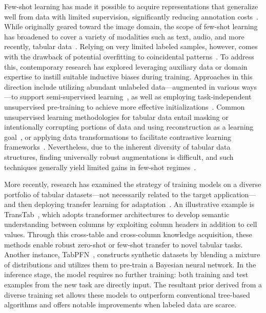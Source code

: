 Few-shot learning has made it possible to acquire representations that generalize well from data with limited supervision, significantly reducing annotation costs~\cite{chen2018closer}. While originally geared toward the image domain, the scope of few-shot learning has broadened to cover a variety of modalities such as text, audio, and more recently, tabular data~\cite{majumder2022few,nam2023stunt,schick2021exploiting}. Relying on very limited labeled samples, however, comes with the drawback of potential overfitting to coincidental patterns~\cite{bartlett2021deep}. To address this, contemporary research has explored leveraging auxiliary data or domain expertise to instill suitable inductive biases during training. Approaches in this direction include utilizing abundant unlabeled data—augmented in various ways—to support semi-supervised learning~\cite{ucar2021subtab,yoon2020vime}, as well as employing task-independent unsupervised pre-training to achieve more effective initializations~\cite{somepalli2021saint}. Common unsupervised learning methodologies for tabular data entail masking or intentionally corrupting portions of data and using reconstruction as a learning goal~\cite{arik2021tabnet,majmundar2022met}, or applying data transformations to facilitate contrastive learning frameworks~\cite{bahri2022scarf,chen2020simple}. Nevertheless, due to the inherent diversity of tabular data structures, finding universally robust augmentations is difficult, and such techniques generally yield limited gains in few-shot regimes~\cite{nam2023stunt}.

More recently, research has examined the strategy of training models on a diverse portfolio of tabular datasets—not necessarily related to the target application—and then deploying transfer learning for adaptation~\cite{zhang2023generative,levin2022transfer,zhu2023xtab}. An illustrative example is TransTab~\cite{wang2022transtab}, which adopts transformer architectures to develop semantic understanding between columns by exploiting column headers in addition to cell values. Through this cross-table and cross-column knowledge acquisition, these methods enable robust zero-shot or few-shot transfer to novel tabular tasks. Another instance, TabPFN~\cite{hollmann2022tabpfn}, constructs synthetic datasets by blending a mixture of distributions and utilizes them to pre-train a Bayesian neural network. In the inference stage, the model requires no further training: both training and test examples from the new task are directly input. The resultant prior derived from a diverse training set allows these models to outperform conventional tree-based algorithms and offers notable improvements when labeled data are scarce.

